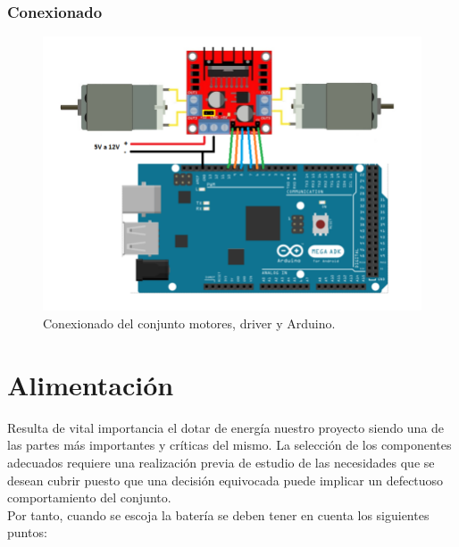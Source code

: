 \subsubsection{Conexionado}

\begin{figure}[H]
  \begin{center}
    \includegraphics[scale=0.4]{imagenes/L298N_conexionado.png}
  \end{center}
  \caption{Conexionado del conjunto motores, driver y Arduino.}
  \label{img:motor_traccion}
\end{figure}


\section{Alimentación}
\label{sub:alimentación}

Resulta de vital importancia el dotar de energía nuestro proyecto siendo una de las partes más importantes y críticas del mismo. La selección de los componentes adecuados
requiere una realización previa de estudio de las necesidades que se desean cubrir puesto que una decisión equivocada puede implicar un defectuoso
comportamiento del conjunto.\\

Por tanto, cuando se escoja la batería se deben tener en cuenta los siguientes puntos:\\

